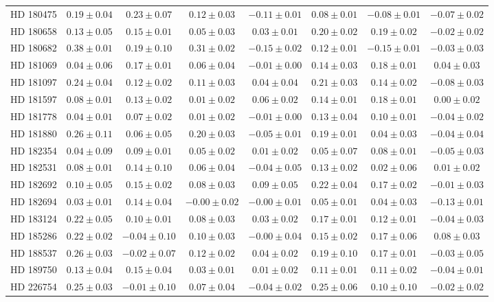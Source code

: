 \begin{table*}
\begin{tabular}{cccccccc}
HD 180475 & $0.19 \pm 0.04$ & $0.23 \pm 0.07$ & $0.12 \pm 0.03$ & $-0.11 \pm 0.01$ & $0.08 \pm 0.01$ & $-0.08 \pm 0.01$ & $-0.07 \pm 0.02$ \\
HD 180658 & $0.13 \pm 0.05$ & $0.15 \pm 0.01$ & $0.05 \pm 0.03$ & $0.03 \pm 0.01$ & $0.20 \pm 0.02$ & $0.19 \pm 0.02$ & $-0.02 \pm 0.02$ \\
HD 180682 & $0.38 \pm 0.01$ & $0.19 \pm 0.10$ & $0.31 \pm 0.02$ & $-0.15 \pm 0.02$ & $0.12 \pm 0.01$ & $-0.15 \pm 0.01$ & $-0.03 \pm 0.03$ \\
HD 181069 & $0.04 \pm 0.06$ & $0.17 \pm 0.01$ & $0.06 \pm 0.04$ & $-0.01 \pm 0.00$ & $0.14 \pm 0.03$ & $0.18 \pm 0.01$ & $0.04 \pm 0.03$ \\
HD 181097 & $0.24 \pm 0.04$ & $0.12 \pm 0.02$ & $0.11 \pm 0.03$ & $0.04 \pm 0.04$ & $0.21 \pm 0.03$ & $0.14 \pm 0.02$ & $-0.08 \pm 0.03$ \\
HD 181597 & $0.08 \pm 0.01$ & $0.13 \pm 0.02$ & $0.01 \pm 0.02$ & $0.06 \pm 0.02$ & $0.14 \pm 0.01$ & $0.18 \pm 0.01$ & $0.00 \pm 0.02$ \\
HD 181778 & $0.04 \pm 0.01$ & $0.07 \pm 0.02$ & $0.01 \pm 0.02$ & $-0.01 \pm 0.00$ & $0.13 \pm 0.04$ & $0.10 \pm 0.01$ & $-0.04 \pm 0.02$ \\
HD 181880 & $0.26 \pm 0.11$ & $0.06 \pm 0.05$ & $0.20 \pm 0.03$ & $-0.05 \pm 0.01$ & $0.19 \pm 0.01$ & $0.04 \pm 0.03$ & $-0.04 \pm 0.04$ \\
HD 182354 & $0.04 \pm 0.09$ & $0.09 \pm 0.01$ & $0.05 \pm 0.02$ & $0.01 \pm 0.02$ & $0.05 \pm 0.07$ & $0.08 \pm 0.01$ & $-0.05 \pm 0.03$ \\
HD 182531 & $0.08 \pm 0.01$ & $0.14 \pm 0.10$ & $0.06 \pm 0.04$ & $-0.04 \pm 0.05$ & $0.13 \pm 0.02$ & $0.02 \pm 0.06$ & $0.01 \pm 0.02$ \\
HD 182692 & $0.10 \pm 0.05$ & $0.15 \pm 0.02$ & $0.08 \pm 0.03$ & $0.09 \pm 0.05$ & $0.22 \pm 0.04$ & $0.17 \pm 0.02$ & $-0.01 \pm 0.03$ \\
HD 182694 & $0.03 \pm 0.01$ & $0.14 \pm 0.04$ & $-0.00 \pm 0.02$ & $-0.00 \pm 0.01$ & $0.05 \pm 0.01$ & $0.04 \pm 0.03$ & $-0.13 \pm 0.01$ \\
HD 183124 & $0.22 \pm 0.05$ & $0.10 \pm 0.01$ & $0.08 \pm 0.03$ & $0.03 \pm 0.02$ & $0.17 \pm 0.01$ & $0.12 \pm 0.01$ & $-0.04 \pm 0.03$ \\
HD 185286 & $0.22 \pm 0.02$ & $-0.04 \pm 0.10$ & $0.10 \pm 0.03$ & $-0.00 \pm 0.04$ & $0.15 \pm 0.02$ & $0.17 \pm 0.06$ & $0.08 \pm 0.03$ \\
HD 188537 & $0.26 \pm 0.03$ & $-0.02 \pm 0.07$ & $0.12 \pm 0.02$ & $0.04 \pm 0.02$ & $0.19 \pm 0.10$ & $0.17 \pm 0.01$ & $-0.03 \pm 0.05$ \\
HD 189750 & $0.13 \pm 0.04$ & $0.15 \pm 0.04$ & $0.03 \pm 0.01$ & $0.01 \pm 0.02$ & $0.11 \pm 0.01$ & $0.11 \pm 0.02$ & $-0.04 \pm 0.01$ \\
HD 226754 & $0.25 \pm 0.03$ & $-0.01 \pm 0.10$ & $0.07 \pm 0.04$ & $-0.04 \pm 0.02$ & $0.25 \pm 0.06$ & $0.10 \pm 0.10$ & $-0.02 \pm 0.02$ \\
\hline
\end{tabular}
\end{table*}
